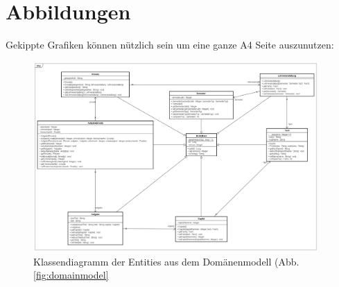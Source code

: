 \chapter{Abbildungen}
Gekippte Grafiken können nützlich sein um eine ganze A4 Seite auszunutzen:
\begin{figure}[ht]
	\centering
	\includegraphics[angle=90,width=0.97\textwidth]{figures/Persistenz}
	\caption{Klassendiagramm der Entities aus dem Domänenmodell (Abb. \ref{fig:domainmodel}}
	\label{fig:persistenz}
\end{figure}

